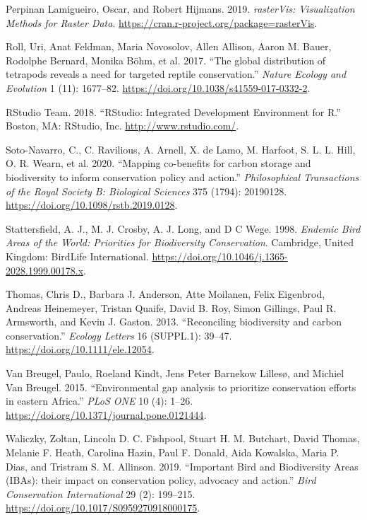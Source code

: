 \documentclass[
]{article}
\begin{document}
\leavevmode\hypertarget{ref-R-rasterVis}{}%
Perpinan Lamigueiro, Oscar, and Robert Hijmans. 2019. \emph{rasterVis: Visualization Methods for Raster Data}. \url{https://cran.r-project.org/package=rasterVis}.

\leavevmode\hypertarget{ref-Roll2017}{}%
Roll, Uri, Anat Feldman, Maria Novosolov, Allen Allison, Aaron M. Bauer, Rodolphe Bernard, Monika Böhm, et al. 2017. ``The global distribution of tetrapods reveals a need for targeted reptile conservation.'' \emph{Nature Ecology and Evolution} 1 (11): 1677--82. \url{https://doi.org/10.1038/s41559-017-0332-2}.

\leavevmode\hypertarget{ref-RStudioTeam2018}{}%
RStudio Team. 2018. ``RStudio: Integrated Development Environment for R.'' Boston, MA: RStudio, Inc. \url{http://www.rstudio.com/}.

\leavevmode\hypertarget{ref-Soto-Navarro2020}{}%
Soto-Navarro, C., C. Ravilious, A. Arnell, X. de Lamo, M. Harfoot, S. L. L. Hill, O. R. Wearn, et al. 2020. ``Mapping co-benefits for carbon storage and biodiversity to inform conservation policy and action.'' \emph{Philosophical Transactions of the Royal Society B: Biological Sciences} 375 (1794): 20190128. \url{https://doi.org/10.1098/rstb.2019.0128}.

\leavevmode\hypertarget{ref-Stattersfield1998}{}%
Stattersfield, A. J., M. J. Crosby, A. J. Long, and D C Wege. 1998. \emph{Endemic Bird Areas of the World: Priorities for Biodiversity Conservation}. Cambridge, United Kingdom: BirdLife International. \url{https://doi.org/10.1046/j.1365-2028.1999.00178.x}.

\leavevmode\hypertarget{ref-Thomas2013}{}%
Thomas, Chris D., Barbara J. Anderson, Atte Moilanen, Felix Eigenbrod, Andreas Heinemeyer, Tristan Quaife, David B. Roy, Simon Gillings, Paul R. Armsworth, and Kevin J. Gaston. 2013. ``Reconciling biodiversity and carbon conservation.'' \emph{Ecology Letters} 16 (SUPPL.1): 39--47. \url{https://doi.org/10.1111/ele.12054}.

\leavevmode\hypertarget{ref-VanBreugel2015}{}%
Van Breugel, Paulo, Roeland Kindt, Jens Peter Barnekow Lillesø, and Michiel Van Breugel. 2015. ``Environmental gap analysis to prioritize conservation efforts in eastern Africa.'' \emph{PLoS ONE} 10 (4): 1--26. \url{https://doi.org/10.1371/journal.pone.0121444}.

\leavevmode\hypertarget{ref-Waliczky2019}{}%
Waliczky, Zoltan, Lincoln D. C. Fishpool, Stuart H. M. Butchart, David Thomas, Melanie F. Heath, Carolina Hazin, Paul F. Donald, Aida Kowalska, Maria P. Dias, and Tristram S. M. Allinson. 2019. ``Important Bird and Biodiversity Areas (IBAs): their impact on conservation policy, advocacy and action.'' \emph{Bird Conservation International} 29 (2): 199--215. \url{https://doi.org/10.1017/S0959270918000175}.
\end{document}
